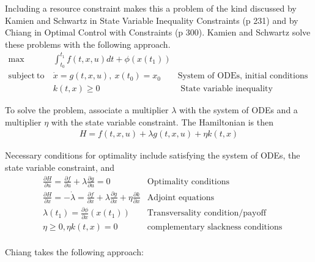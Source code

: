 \documentclass[12pt, oneside]{article}   	%
\begin{document}
Including a resource constraint makes this a problem of the kind discussed by Kamien and Schwartz in State Variable Inequality Constraints (p 231) and by Chiang in Optimal Control with Constraints (p 300). Kamien and Schwartz solve these problems with the following approach.
%
\begin{align}
\max &  \int_{t_0}^{t_1}  f(t,x,u) dt + \phi(x(t_1)) \nonumber \\
\mathrm{subject\ to\ } 
& \dot{x} = g(t,x,u), \ x(t_0) = x_0 \nonumber & \mbox{System of ODEs, initial conditions}  \nonumber \\
& k(t,x) \geq 0 & \mbox{ State variable inequality constraint}  \nonumber
\end{align}

To solve the problem, associate a multiplier $\lambda$ with the system of ODEs and a multiplier $\eta$ with the state variable constraint. The Hamiltonian is then
%
\begin{align}
H = f(t,x,u) + \lambda g(t,x,u) + \eta k(t,x) \nonumber
\end{align}

Necessary conditions for optimality include satisfying the system of ODEs, the state variable constraint, and
%
\begin{align}
& \frac{\partial H}{\partial u}  = \frac{\partial f}{\partial u} + \lambda \frac{\partial g}{\partial u} = 0  & \mbox{Optimality conditions} \nonumber \\
 & \frac{\partial H}{\partial x}  = - \dot{\lambda} = \frac{\partial f}{\partial x} + \lambda \frac{\partial g}{\partial x} + \eta \frac{\partial k}{\partial x} & \mbox{Adjoint equations} \nonumber \\
& \lambda(t_1)  = \frac{\partial \phi}{\partial x}  (x(t_1))  & \mbox{Transversality condition/payoff} \nonumber \\
& \eta \geq 0, \eta k(t,x) = 0  & \mbox{complementary slackness conditions} \nonumber \\
\end{align}

Chiang takes the following approach:
\end{document}
